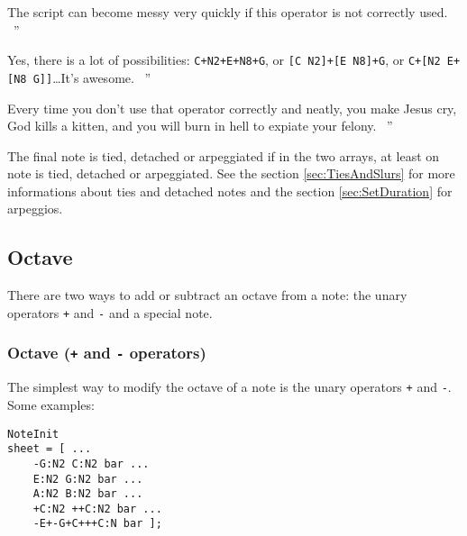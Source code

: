 \documentclass{article}
\newcommand\wikipedia{\textsc{Wikipedia}\xspace}
\newcommand\wiktionary{\textsc{Wiktionary}\xspace}
\newcommand\google{\textsc{Google}\xspace}
\newcommand\footurl[1]{\footnote{\url{#1}}\xspace}
\newenvironment{meenv}{ \par \noindent \makebox[6em][r]{ \textcolor{mecolor}{Me}: `` --~}}{~''}
\newenvironment{myselfenv}{ \par \noindent \makebox[6em][r]{ \textcolor{myselfcolor}{Myself}: `` --~}}{~''}
\newcommand{ \me }[1]{%
\begin{meenv}%
	#1%
\end{meenv} }
\newcommand{ \myself }[1]{%
\begin{myselfenv}%
	#1%
\end{myselfenv} }
\begin{document}
\myself{The script can become messy very quickly if this operator is not correctly used.}
\me{Yes, there is a lot of possibilities: \lstinline!C+N2+E+N8+G!, or \lstinline![C N2]+[E N8]+G!, or \lstinline!C+[N2 E+[N8 G]]!\dots It's awesome.}
\myself{Every time you don't use that operator correctly and neatly, you make Jesus cry, God kills a kitten, and you will burn in hell to expiate your felony.}

The final note is tied, detached or arpeggiated if in the two arrays, at least on note is tied, detached or arpeggiated. See the section \ref{sec:TiesAndSlurs} for more informations about ties and detached notes and the section \ref{sec:SetDuration} for arpeggios.


\subsection{Octave}
\label{sec:Octave}

There are two ways to add or subtract an octave from a note: the unary operators \lstinline!+! and \lstinline!-! and a special note.

\subsubsection{Octave (\lstinline!+! and \lstinline!-! operators)}
\label{sec:OctaveOperators}

The simplest way to modify the octave of a note is the unary operators \lstinline!+! and \lstinline!-!. Some examples: \\

\begin{lstlisting}
NoteInit
sheet = [ ...
	-G:N2 C:N2 bar ...
	E:N2 G:N2 bar ...
	A:N2 B:N2 bar ...
	+C:N2 ++C:N2 bar ...
	-E+-G+C+++C:N bar ];
\end{lstlisting}
\end{document}
